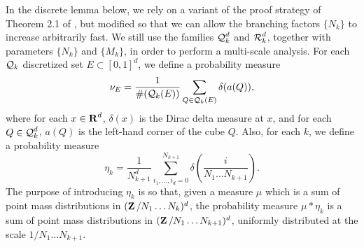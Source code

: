 In the discrete lemma below, we rely on a variant of the proof strategy of Theorem 2.1 of \cite{Shmerkin}, but modified so that we can allow the branching factors $\{ N_k \}$ to increase arbitrarily fast. We still use the families $\operatorname{\mathcal{Q}}_k^d$ and $\operatorname{\mathcal{R}}_k^d$, together with parameters $\{ N_k \}$ and $\{ M_k \}$, in order to perform a multi-scale analysis. For each $\operatorname{\mathcal{Q}}_k$ discretized set $E \subset [0,1]^d$, we define a probability measure
%
\[ \nu_E = \frac{1}{\#(\operatorname{\mathcal{Q}}_k(E))} \sum_{Q \in \operatorname{\mathcal{Q}}_k(E)} \delta(a(Q)), \]
%
where for each $x \in \operatorname{\mathbf{R}}^d$, $\delta(x)$ is the Dirac delta measure at $x$, and for each $Q \in \operatorname{\mathcal{Q}}_k^d$, $a(Q)$ is the left-hand corner of the cube $Q$. Also, for each $k$, we define a probability measure
%
\[ \eta_k = \frac{1}{N_{k+1}^d} \sum_{i_1, \dots, i_d = 0}^{N_{k+1}} \delta \left( \frac{i}{N_1 \dots N_{k+1}} \right).  \]
%
The purpose of introducing $\eta_k$ is so that, given a measure $\mu$ which is a sum of point mass distributions in $(\operatorname{\mathbf{Z}}/N_1 \dots N_k)^d$, the probability measure $\mu * \eta_k$ is a sum of point mass distributions in $(\operatorname{\mathbf{Z}}/N_1 \dots N_{k+1})^d$, uniformly distributed at the scale $1/N_1 \dots N_{k+1}$.


